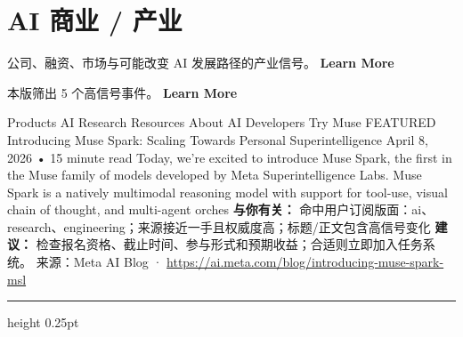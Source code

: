 \documentclass[10.5pt]{ctexart}
\begin{document}
\section*{AI 商业 / 产业}
{\color{ormuted} 公司、融资、市场与可能改变 AI 发展路径的产业信号。}
\vspace{2mm}
{\LARGE\bfseries Learn More}\par
\vspace{1mm}
{\color{ormuted} 本版筛出 5 个高信号事件。}
\vspace{3mm}
{\Large\bfseries Learn More}\par
Products AI Research Resources About AI Developers Try Muse FEATURED Introducing Muse Spark: Scaling Towards Personal Superintelligence April 8, 2026 • 15 minute read Today, we’re excited to introduce Muse Spark, the first in the Muse family of models developed by Meta Superintelligence Labs. Muse Spark is a natively multimodal reasoning model with support for tool-use, visual chain of thought, and multi-agent orches
\textbf{与你有关：} 命中用户订阅版面：ai、research、engineering；来源接近一手且权威度高；标题/正文包含高信号变化
\textbf{建议：} 检查报名资格、截止时间、参与形式和预期收益；合适则立即加入任务系统。
{\footnotesize\color{ormuted} 来源：Meta AI Blog · \url{https://ai.meta.com/blog/introducing-muse-spark-msl}}
\vspace{4mm}
\hrule height 0.25pt
\vspace{3mm}
\end{document}
